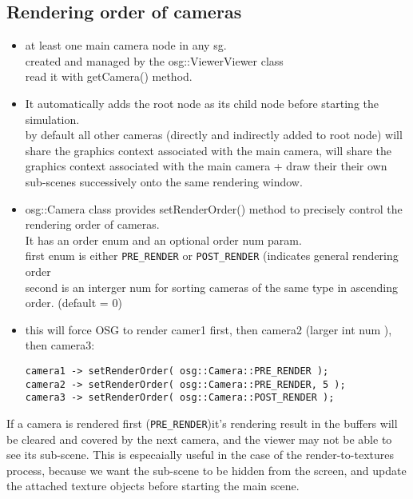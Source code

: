\documentclass[a4paper,12pt]{book}
\begin{document}
\subsection{Rendering order of cameras}
\begin{itemize}
\item at least one main camera node in any sg.\\
\textrightarrow created and managed by the osg::ViewerViewer class\\
\textrightarrow read it with getCamera() method.
\item It automatically adds the root node as its child node before starting the simulation.\\
\textrightarrow by default all other cameras (directly and indirectly added to root node) will share the graphics context associated with the main camera, will share the graphics context associated with the main camera + draw their their own sub-scenes successively onto the same rendering window.

\item osg::Camera class provides setRenderOrder() method to precisely control the rendering order of cameras.\\
\textrightarrow It has an order enum and an optional order num param.\\
\textrightarrow first enum is either \verb|PRE_RENDER| or \verb|POST_RENDER| (indicates general rendering order\\
\textrightarrow second is an interger num for sorting cameras of the same type in ascending order. (default = 0)
\item this will force OSG to render camer1 first, then camera2 (larger int num ), then camera3:
\begin{lstlisting}
camera1 -> setRenderOrder( osg::Camera::PRE_RENDER );
camera2 -> setRenderOrder( osg::Camera::PRE_RENDER, 5 );
camera3 -> setRenderOrder( osg::Camera::POST_RENDER );
\end{lstlisting}

\end{itemize}

If a camera is rendered first (\verb|PRE_RENDER|)it's rendering result in the buffers will be cleared and covered by the next camera, and the viewer may not be able to see its sub-scene. This is especaially useful in the case of the render-to-textures process, because we want the sub-scene to be hidden from the screen, and update the attached texture objects before starting the main scene.\\
\end{document}
